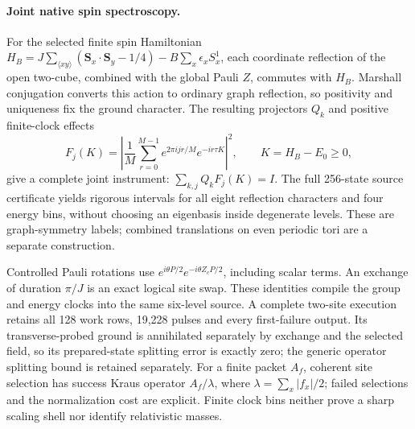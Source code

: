 \paragraph{Joint native spin spectroscopy.}
For the selected finite spin Hamiltonian
$H_B=J\sum_{\langle xy\rangle}(\mathbf S_x\cdot\mathbf S_y-1/4)
-B\sum_x\epsilon_xS_x^1$, each coordinate reflection of the open two-cube,
combined with the global Pauli $Z$, commutes with $H_B$.
Marshall conjugation converts this action to ordinary graph reflection,
so positivity and uniqueness fix the ground character.
The resulting projectors $Q_k$ and positive finite-clock effects
\[
 F_j(K)=\left|\frac1M\sum_{r=0}^{M-1}
 e^{2\pi i jr/M}e^{-ir\tau K}\right|^2,
 \qquad K=H_B-E_0\geq0,
\]
give a complete joint instrument: $\sum_{k,j}Q_kF_j(K)=I$.
The full 256-state source certificate yields rigorous intervals for all
eight reflection characters and four energy bins, without choosing an
eigenbasis inside degenerate levels.  These are graph-symmetry labels;
combined translations on even periodic tori are a separate construction.

Controlled Pauli rotations use
$e^{i\theta P/2}e^{-i\theta Z_cP/2}$, including scalar terms.
An exchange of duration $\pi/J$ is an exact logical site swap.
These identities compile the group and energy clocks into the same
six-level source.  A complete two-site execution retains all 128 work
rows, 19,228 pulses and every first-failure output.  Its transverse-probed
ground is annihilated separately by exchange and the selected field,
so its prepared-state splitting error is exactly zero; the generic
operator splitting bound is retained separately.
For a finite packet $A_f$, coherent site selection has success Kraus
operator $A_f/\lambda$, where $\lambda=\sum_x|f_x|/2$; failed selections
and the normalization cost are explicit.  Finite clock bins neither
prove a sharp scaling shell nor identify relativistic masses.
